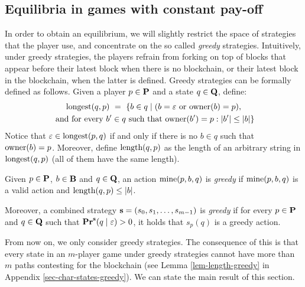 \subsection{Equilibria in games with constant pay-off} 

In order to obtain an equilibrium, we will slightly restrict the space of strategies that the player use, and concentrate on the so called {\em greedy} strategies. Intuitively, under greedy strategies, the players refrain from forking on top of blocks that appear before their latest block when there is no blockchain, or their latest block in the blockchain, when the latter is defined. Greedy strategies can be formally defined as follows. 
Given a player $p \in \mathbf{P}$ and a state $q \in \mathbf{Q}$, define:
\begin{multline*}
{\text{\rm longest}}(q,p) \ = \ \{ b \in q \mid (b = \varepsilon \text{ or } \text{\rm owner}(b) = p),\\
\text{ and for every } b' \in q \text{ such that } \text{\rm owner}(b') = p : |b'| \leq |b|\}
\end{multline*}
Notice that $\varepsilon \in {\text{\rm longest}}(p,q)$ if and only if there is no $b \in q$ such that $\text{\rm owner}(b) = p$. Moreover, define $\text{\rm length}(q,p)$ as the length of an arbitrary string in ${\text{\rm longest}}(q,p)$ (all of them have the same length).
\begin{mydef}\label{def-greedy}
Given $p \in \mathbf{P}$, $b \in \mathbf{B}$ and $q \in \mathbf{Q}$,  an action $\text{\rm mine}(p,b,q)$ is {\em greedy} if $\text{\rm mine}(p,b,q)$ is a valid action and $\text{\rm length}(q,p) \leq |b|$.

Moreover, a combined strategy $\mathbf{s} = (s_0, s_1, \ldots, s_{m-1})$ is {\em greedy} if for every $p \in \mathbf{P}$ and  $q \in \mathbf{Q}$ such that $\mathbf{Pr}^{\mathbf{s}}(q \mid \varepsilon) > 0$, it holds that $s_p(q)$ is a greedy action.
\end{mydef}

From now on, we only consider greedy strategies. 
%
The consequence of this is that every state in an $m$-player game under greedy strategies cannot have more than $m$ paths contesting for the blockchain (see Lemma \ref{lem-length-greedy} in Appendix \ref{sec-char-states-greedy}). %
%
%
%
We can state the main result of this section. 

